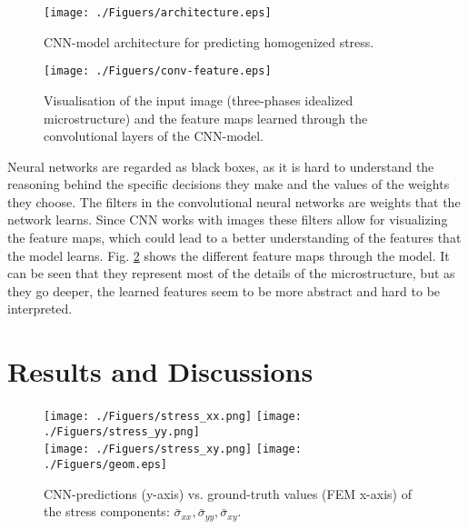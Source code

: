 \documentclass[final,3p,times]{elsarticle}
\begin{document}
\begin{figure}[t]
	\centering 
	\texttt{[image: ./Figuers/architecture.eps]} 
	\caption{CNN-model architecture for predicting homogenized stress.}
	\label{Architecture}
\end{figure}


\begin{figure}[t]
	\centering 
	\texttt{[image: ./Figuers/conv-feature.eps]} 
	\caption{Visualisation of the input image (three-phases idealized microstructure) and the feature maps learned through the convolutional layers of the CNN-model.}
	\label{Feature_maps}
\end{figure}




Neural networks are regarded as black boxes, as it is hard to understand the reasoning behind the specific decisions they make and the values of the weights they choose. The filters in the convolutional neural networks are weights that the network learns. Since CNN works with images these filters allow for visualizing the feature maps, which could lead to a better understanding of the features that the model learns. Fig. \ref{Feature_maps} shows the different feature maps through the model. It can be seen that they represent most of the details of the microstructure, but as they go deeper, the learned features seem to be more abstract and hard to be interpreted.



\section{Results and Discussions}
\label{sec5-CNN}

\begin{figure}[t]
	\centering 
	\texttt{[image: ./Figuers/stress\_xx.png]} \qquad\qquad\qquad
	\texttt{[image: ./Figuers/stress\_yy.png]}\\[4mm]
 	\texttt{[image: ./Figuers/stress\_xy.png]} \qquad
	\texttt{[image: ./Figuers/geom.eps]} 
	\caption{CNN-predictions (y-axis) vs. ground-truth values (FEM x-axis) of the stress components: $\bar{\sigma}_{xx}, \bar{\sigma}_{yy}, \bar{\sigma}_{xy} $.}
	\label{example1-1}
\end{figure}
\end{document}
